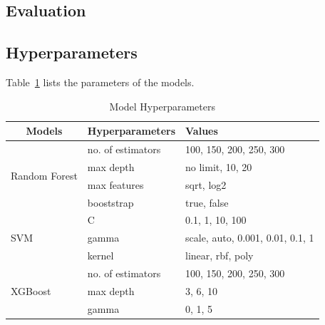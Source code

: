 \begin{appendices}
\section{Evaluation}
\label{app:evalution}

\subsection{Hyperparameters}
Table~\ref{tab:model_hyperparameters} lists the parameters of the models. 

\begin{table}[htb]
\centering
\caption{Model Hyperparameters}
\label{tab:model_hyperparameters}
\begin{tabular}{lll}
\hline
\multicolumn{1}{c}{\textbf{Models}} & \textbf{Hyperparameters} & \textbf{Values}                  \\ \hline
\multirow{4}{*}{Random Forest}      & no. of estimators        & 100, 150, 200, 250, 300          \\
                                    & max depth                & no limit, 10, 20                 \\
                                    & max features             & sqrt, log2                       \\
                                    & booststrap               & true, false                      \\ \hline
\multirow{3}{*}{SVM}                & C                        & 0.1, 1, 10, 100                  \\
                                    & gamma                    & scale, auto, 0.001, 0.01, 0.1, 1 \\
                                    & kernel                   & linear, rbf, poly                \\ \hline
\multirow{3}{*}{XGBoost}            & no. of estimators        & 100, 150, 200, 250, 300          \\
                                    & max depth                & 3, 6, 10                         \\
                                    & gamma                    & 0, 1, 5                          \\ \hline
\end{tabular}
\end{table}


\end{appendices}
